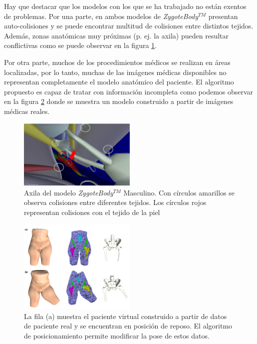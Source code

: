 Hay que destacar que los modelos con los que se ha trabajado no están exentos de problemas. Por una parte, en ambos modelos de \emph{ZygoteBody}$^{TM}$ presentan auto-colisiones y se puede encontrar multitud de colisiones entre distintos tejidos. Además, zonas anatómicas muy próximas (p. ej. la axila) pueden resultar conflictivas como se puede observar en la figura \ref{fig:zygoteproblems}. 

Por otra parte, muchos de los procedimientos médicos se realizan en áreas localizadas, por lo tanto, muchas de las imágenes médicas disponibles no representan completamente el modelo anatómico del paciente. El algoritmo propuesto es capaz de tratar con información incompleta como podemos observar en la figura \ref{fig:patient} donde se muestra un modelo construido a partir de imágenes médicas reales.

\begin{figure}[h]
   \centering
    \includegraphics[width=0.5\textwidth]{IMG/zygoteproblems.png}
    \caption{Axila del modelo \emph{ZygoteBody}$^{TM}$ Masculino. Con círculos amarillos se observa colisiones entre diferentes tejidos. Los círculos rojos representan colisiones con el tejido de la piel  }
   \label{fig:zygoteproblems}
\end{figure}


\begin{figure}[h]
   \centering
    \includegraphics[width=0.5\textwidth]{IMG/patient.png}
    \caption{ La fila (a) muestra el paciente virtual construido a partir de datos de paciente real y se encuentran en posición de reposo. El algoritmo de posicionamiento permite modificar la pose de estos datos.
    }
   \label{fig:patient}
\end{figure}
%

